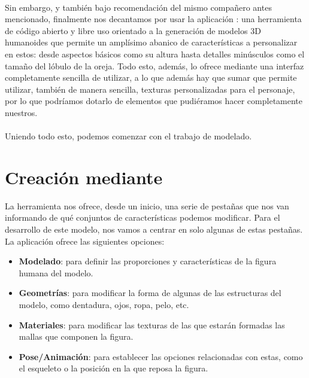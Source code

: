 \documentclass{subfiles}
\begin{document}
    \paragraph{}
    Sin embargo, y también bajo recomendación del mismo compañero antes mencionado, finalmente nos decantamos por usar la aplicación \makehuman \cite{web:makehuman}: una herramienta de código abierto y libre uso orientado a la generación de modelos 3D humanoides que permite un amplísimo abanico de características a personalizar en estos: desde aspectos básicos como su altura hasta detalles minúsculos como el tamaño del lóbulo de la oreja. Todo esto, además, lo ofrece mediante una interfaz completamente sencilla de utilizar, a lo que además hay que sumar que permite utilizar, también de manera sencilla, texturas personalizadas para el personaje, por lo que podríamos dotarlo de elementos que pudiéramos hacer completamente nuestros.

    \paragraph{}
    Uniendo todo esto, podemos comenzar con el trabajo de modelado.

    \section{Creación mediante \makehuman}
    \label{sec:4.1}

    La herramienta \makehuman nos ofrece, desde un inicio, una serie de pestañas que nos van informando de qué conjuntos de características podemos modificar. Para el desarrollo de este modelo, nos vamos a centrar en solo algunas de estas pestañas. La aplicación ofrece las siguientes opciones:

    \begin{itemize}
        \item \textbf{Modelado}: para definir las proporciones y características de la figura humana del modelo.
        \item \textbf{Geometrías}: para modificar la forma de algunas de las estructuras del modelo, como dentadura, ojos, ropa, pelo, etc.
        \item \textbf{Materiales}: para modificar las texturas de las que estarán formadas las mallas que componen la figura.
        \item \textbf{Pose/Animación}: para establecer las opciones relacionadas con estas, como el esqueleto o la posición en la que reposa la figura.
    \end{itemize}
\end{document}
